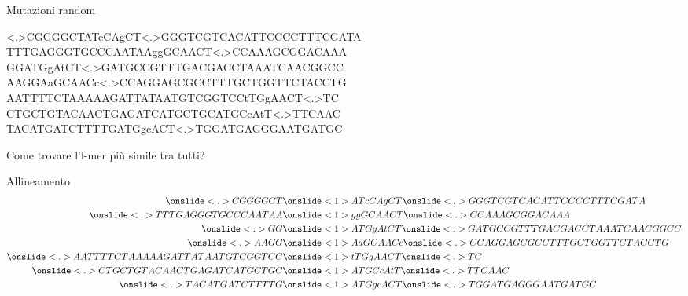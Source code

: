 	\begin{frame}{Mutazioni random}
		\begin{center}						
			\onslide<.>CGGGGCT\onslide<1>ATcCAgCT\onslide<.>GGGTCGTCACATTCCCCTTTCGATA\\
			TTTGAGGGTGCCCAATAA\onslide<1>ggGCAACT\onslide<.>CCAAAGCGGACAAA\\
			GG\onslide<1>ATGgAtCT\onslide<.>GATGCCGTTTGACGACCTAAATCAACGGCC\\
			AAGG\onslide<1>AaGCAACc\onslide<.>CCAGGAGCGCCTTTGCTGGTTCTACCTG\\
			AATTTTCTAAAAAGATTATAATGTCGGTCC\onslide<1>tTGgAACT\onslide<.>TC\\
			CTGCTGTACAACTGAGATCATGCTGC\onslide<1>ATGCcAtT\onslide<.>TTCAAC\\
			TACATGATCTTTTG\onslide<1>ATGgcACT\onslide<.>TGGATGAGGGAATGATGC
		\end{center}
		Come trovare l'l-mer più simile tra tutti?
	\end{frame}
	
	\begin{frame}{Allineamento}\tiny
		\begin{align*}					
			\onslide<.>CGGGGCT&\onslide<1>ATcCAgCT\onslide<.>GGGTCGTCACATTCCCCTTTCGATA\\
			\onslide<.>TTTGAGGGTGCCCAATAA&\onslide<1>ggGCAACT\onslide<.>CCAAAGCGGACAAA\\
			\onslide<.>GG&\onslide<1>ATGgAtCT\onslide<.>GATGCCGTTTGACGACCTAAATCAACGGCC\\
			\onslide<.>AAGG&\onslide<1>AaGCAACc\onslide<.>CCAGGAGCGCCTTTGCTGGTTCTACCTG\\
			\onslide<.>AATTTTCTAAAAAGATTATAATGTCGGTCC&\onslide<1>tTGgAACT\onslide<.>TC\\
			\onslide<.>CTGCTGTACAACTGAGATCATGCTGC&\onslide<1>ATGCcAtT\onslide<.>TTCAAC\\
			\onslide<.>TACATGATCTTTTG&\onslide<1>ATGgcACT\onslide<.>TGGATGAGGGAATGATGC
		\end{align*}
	\end{frame}
	
